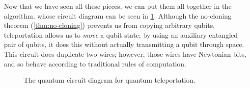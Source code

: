 Now that we have seen all these pieces, we can put them all together in the
 algorithm, whose circuit diagram can be seen in
\cref{qcd:teleportation}.  Although the no-cloning theorem
(\cref{thm:no-cloning}) prevents us from copying arbitrary qubits, teleportation
allows us to \emph{move} a qubit state; by using an auxiliary entangled pair of
qubits, it does this without actually transmitting a qubit through space.  This
circuit does duplicate two wires; however, those wires have Newtonian bits, and
so behave according to traditional rules of computation.

\begin{figure}
  \centerline{}
  \caption{The quantum circuit diagram for quantum teleportation.}
  \label{qcd:teleportation}
\end{figure}

